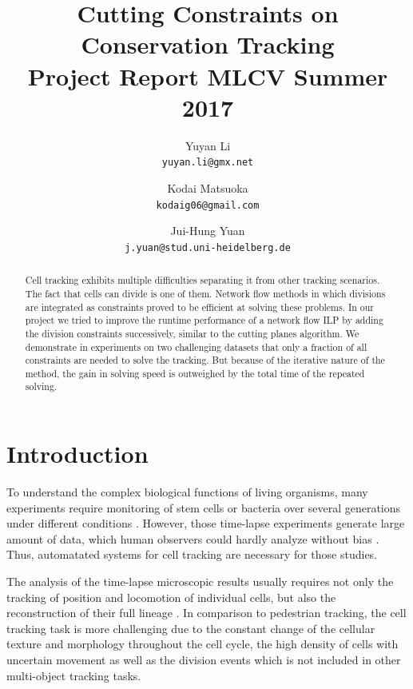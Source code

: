 \documentclass[10pt,twocolumn,letterpaper]{article}
\begin{document}
\title{Cutting Constraints on Conservation Tracking\\
  \large{Project Report MLCV Summer 2017}
}

\author{
Yuyan Li\\
{\tt\small yuyan.li@gmx.net}
\and
Kodai Matsuoka\\
{\tt\small kodaig06@gmail.com}
\and
Jui-Hung Yuan\\
{\tt\small j.yuan@stud.uni-heidelberg.de}
}

\maketitle

\begin{abstract}
  Cell tracking exhibits multiple difficulties separating it from other tracking scenarios. The fact that cells can divide is one of them. Network flow methods in which divisions are integrated as constraints proved to be efficient at solving these problems. In our project we tried to improve the runtime performance of a network flow ILP by adding the division constraints successively, similar to the cutting planes algorithm. We demonstrate in experiments on two challenging datasets that only a fraction of all constraints are needed to solve the tracking. But because of the iterative nature of the method, the gain in solving speed is outweighed by the total time of the repeated solving.
\end{abstract}

\section{Introduction}

To understand the complex biological functions of living organisms, many experiments require monitoring of stem cells or bacteria over several generations under different conditions  \cite{elowitz2002stochastic, schroeder2011long}. However, those time-lapse experiments generate large amount of data, which human observers could hardly analyze without bias \cite{wu2010microscope}. Thus, automatated systems for cell tracking are necessary for those studies.

The analysis of the time-lapse microscopic results usually requires not only the tracking of position and locomotion of individual cells, but also the reconstruction of their full lineage \cite{amat2013towards}. In comparison to pedestrian tracking, the cell tracking task is more challenging due to the constant change of the cellular texture and morphology throughout the cell cycle, the high density of cells with uncertain movement as well as the division events which is not included in other multi-object tracking tasks.
\end{document}
